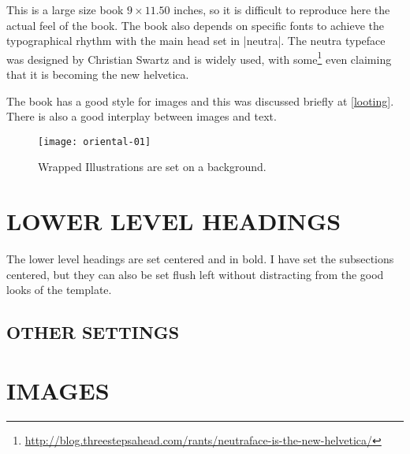This is a large size book $9\times11.50$ inches, so it is difficult to reproduce here the actual feel of the book. The book also depends on specific fonts to achieve the typographical rhythm with the main head set in |neutra|. The neutra typeface was designed by Christian Swartz and is widely used, with some\footnote{\protect\url{http://blog.threestepsahead.com/rants/neutraface-is-the-new-helvetica/}} even claiming that it is becoming the new helvetica.

The book has a good style for images and this was discussed briefly at \autoref{looting}. There is also a good interplay between images and text.



\begin{figure}[p]
\centering
\texttt{[image: oriental-01]}
\caption{Wrapped Illustrations are set on a background.}
\end{figure}




          
\section{LOWER LEVEL HEADINGS}

The lower level headings are set centered and in bold. I have set the subsections centered, but they can also be set flush left without distracting from the good looks of the template.

\subsection{OTHER SETTINGS}
\lorem \lorem

\section{IMAGES}




